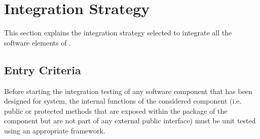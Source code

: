 \section{Integration Strategy}
This section explains the integration strategy selected to integrate all the software elements of \myTaxiService{}.
%
\subsection{Entry Criteria}
Before starting the integration testing of any software component that has been designed for \myTaxiService{} system, the internal functions of the considered component (i.e. public or protected methods that are exposed within the package of the component but are not part of any external public interface) must be unit tested using an appropriate framework.
%

